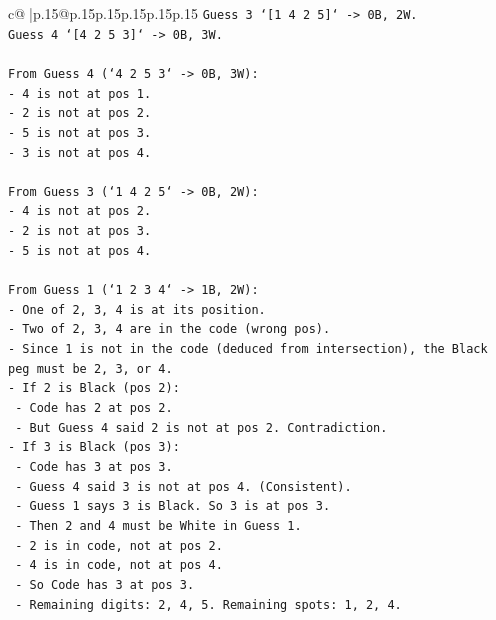 \documentclass{article}
\begin{document}
{\begin{supertabular}{c@{$\;$}|p{.15\linewidth}@{}p{.15\linewidth}p{.15\linewidth}p{.15\linewidth}p{.15\linewidth}p{.15\linewidth}}
{{{\texttt{Guess 3 `{[}1 4 2 5{]}` {-}> 0B, 2W.} \\
\texttt{Guess 4 `{[}4 2 5 3{]}` {-}> 0B, 3W.} \\
\\ 
\texttt{From Guess 4 (`4 2 5 3` {-}> 0B, 3W):} \\
\texttt{{-}   4 is not at pos 1.} \\
\texttt{{-}   2 is not at pos 2.} \\
\texttt{{-}   5 is not at pos 3.} \\
\texttt{{-}   3 is not at pos 4.} \\
\\ 
\texttt{From Guess 3 (`1 4 2 5` {-}> 0B, 2W):} \\
\texttt{{-}   4 is not at pos 2.} \\
\texttt{{-}   2 is not at pos 3.} \\
\texttt{{-}   5 is not at pos 4.} \\
\\ 
\texttt{From Guess 1 (`1 2 3 4` {-}> 1B, 2W):} \\
\texttt{{-}   One of 2, 3, 4 is at its position.} \\
\texttt{{-}   Two of 2, 3, 4 are in the code (wrong pos).} \\
\texttt{{-}   Since 1 is not in the code (deduced from intersection), the Black peg must be 2, 3, or 4.} \\
\texttt{{-}   If 2 is Black (pos 2):} \\
\texttt{    {-}   Code has 2 at pos 2.} \\
\texttt{    {-}   But Guess 4 said 2 is not at pos 2. Contradiction.} \\
\texttt{{-}   If 3 is Black (pos 3):} \\
\texttt{    {-}   Code has 3 at pos 3.} \\
\texttt{    {-}   Guess 4 said 3 is not at pos 4. (Consistent).} \\
\texttt{    {-}   Guess 1 says 3 is Black. So 3 is at pos 3.} \\
\texttt{    {-}   Then 2 and 4 must be White in Guess 1.} \\
\texttt{        {-}   2 is in code, not at pos 2.} \\
\texttt{        {-}   4 is in code, not at pos 4.} \\
\texttt{    {-}   So Code has 3 at pos 3.} \\
\texttt{    {-}   Remaining digits: 2, 4, 5. Remaining spots: 1, 2, 4.} \\
}}}
\end{supertabular}}
\end{document}
